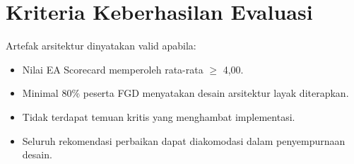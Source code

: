 \section{Kriteria Keberhasilan Evaluasi}
Artefak arsitektur dinyatakan valid apabila:
\begin{itemize}
  \item Nilai EA Scorecard\texttrademark{} memperoleh rata-rata $\geq$ 4,00.
  \item Minimal 80\% peserta FGD menyatakan desain arsitektur layak diterapkan.
  \item Tidak terdapat temuan kritis yang menghambat implementasi.
  \item Seluruh rekomendasi perbaikan dapat diakomodasi dalam penyempurnaan desain.
\end{itemize}
